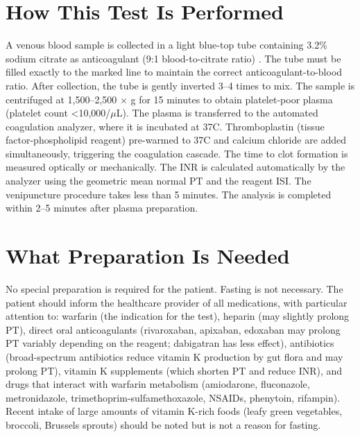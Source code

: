 \section*{How This Test Is Performed}
A venous blood sample is collected in a light blue-top tube containing 3.2\% sodium citrate as anticoagulant (9:1 blood-to-citrate ratio) \cite{fischbach2023manual}. The tube must be filled exactly to the marked line to maintain the correct anticoagulant-to-blood ratio. After collection, the tube is gently inverted 3--4 times to mix. The sample is centrifuged at 1,500--2,500 $\times$ g for 15 minutes to obtain platelet-poor plasma (platelet count <10,000/$\mu$L). The plasma is transferred to the automated coagulation analyzer, where it is incubated at 37\textdegree{}C. Thromboplastin (tissue factor-phospholipid reagent) pre-warmed to 37\textdegree{}C and calcium chloride are added simultaneously, triggering the coagulation cascade. The time to clot formation is measured optically or mechanically. The INR is calculated automatically by the analyzer using the geometric mean normal PT and the reagent ISI. The venipuncture procedure takes less than 5 minutes. The analysis is completed within 2--5 minutes after plasma preparation.

\section*{What Preparation Is Needed}
No special preparation is required for the patient. Fasting is not necessary. The patient should inform the healthcare provider of all medications, with particular attention to: warfarin (the indication for the test), heparin (may slightly prolong PT), direct oral anticoagulants (rivaroxaban, apixaban, edoxaban may prolong PT variably depending on the reagent; dabigatran has less effect), antibiotics (broad-spectrum antibiotics reduce vitamin K production by gut flora and may prolong PT), vitamin K supplements (which shorten PT and reduce INR), and drugs that interact with warfarin metabolism (amiodarone, fluconazole, metronidazole, trimethoprim-sulfamethoxazole, NSAIDs, phenytoin, rifampin). Recent intake of large amounts of vitamin K-rich foods (leafy green vegetables, broccoli, Brussels sprouts) should be noted but is not a reason for fasting.

